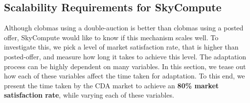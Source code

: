 \documentclass[10pt,journal,compsoc]{IEEEtran}
\begin{document}
%
       
\subsection{Scalability Requirements for SkyCompute}
Although clobmas using a double-auction is better than clobmas using a posted offer, SkyCompute would like to know if this mechanism scales well. To investigate this, we pick a level of market satisfaction rate, that is higher than posted-offer, and measure how long it takes to achieve this level. The adaptation process can be highly dependent on many variables. In this section, we tease out how each of these variables affect the time taken for adaptation. To this end, we present the time taken by the CDA market to achieve an \textbf{80\%  market satisfaction rate}, while varying each of these variables.
\end{document}
